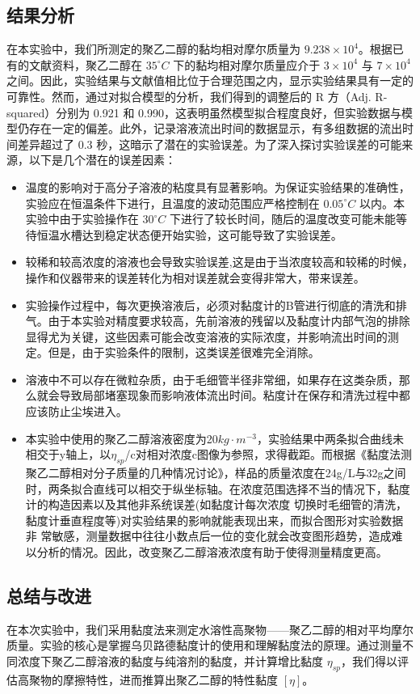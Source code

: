 \documentclass[12pt,hyperref,a4paper,UTF8]{ctexart}
\begin{document}
\subsection{结果分析}
在本实验中，我们所测定的聚乙二醇的黏均相对摩尔质量为 $9.238 \times 10^4$。根据已有的文献资料，聚乙二醇在 $35^\circ C$ 下的黏均相对摩尔质量应介于 $3 \times 10^4$ 与 $7 \times 10^4$ 之间。因此，实验结果与文献值相比位于合理范围之内，显示实验结果具有一定的可靠性。然而，通过对拟合模型的分析，我们得到的调整后的 R 方（Adj. R-squared）分别为 0.921 和 0.990，这表明虽然模型拟合程度良好，但实验数据与模型仍存在一定的偏差。此外，记录溶液流出时间的数据显示，有多组数据的流出时间差异超过了 0.3 秒，这暗示了潜在的实验误差。为了深入探讨实验误差的可能来源，以下是几个潜在的误差因素：
\begin{itemize}
    \item 温度的影响对于高分子溶液的粘度具有显著影响。\cite{1}为保证实验结果的准确性，实验应在恒温条件下进行，且温度的波动范围应严格控制在 $0.05^\circ C$ 以内。本实验中由于实验操作在 $30^\circ C$ 下进行了较长时间，随后的温度改变可能未能等待恒温水槽达到稳定状态便开始实验，这可能导致了实验误差。
    \item 较稀和较高浓度的溶液也会导致实验误差\cite{2},这是由于当浓度较高和较稀的时候，操作和仪器带来的误差转化为相对误差就会变得非常大，带来误差。
    \item 实验操作过程中，每次更换溶液后，必须对黏度计的B管进行彻底的清洗和排气。由于本实验对精度要求较高，先前溶液的残留以及黏度计内部气泡的排除显得尤为关键，这些因素可能会改变溶液的实际浓度，并影响流出时间的测定。但是，由于实验条件的限制，这类误差很难完全消除。
    \item 溶液中不可以存在微粒杂质，由于毛细管半径非常细，如果存在这类杂质，那么就会导致局部堵塞现象而影响液体流出时间\cite{3}。粘度计在保存和清洗过程中都应该防止尘埃进入。
    \item 本实验中使用的聚乙二醇溶液密度为20$kg\cdot m^{-3}$，实验结果中两条拟合曲线未相交于y轴上，以$\eta _{sp}$/c对相对浓度c图像为参照，求得截距。而根据《黏度法测聚乙二醇相对分子质量的几种情况讨论》\cite{1}，样品的质量浓度在24g/L与32g之间时，两条拟合直线可以相交于纵坐标轴。在浓度范围选择不当的情况下，黏度计的构造因素以及其他非系统误差(如黏度计每次浓度
切换时毛细管的清洗，黏度计垂直程度等)对实验结果的影响就能表现出来，而拟合图形对实验数据非
常敏感，测量数据中往往小数点后一位的变化就会改变图形趋势，造成难以分析的情况。因此，改变聚乙二醇溶液浓度有助于使得测量精度更高。
\end{itemize}

\subsection{总结与改进}
在本次实验中，我们采用黏度法来测定水溶性高聚物——聚乙二醇的相对平均摩尔质量。实验的核心是掌握乌贝路德黏度计的使用和理解黏度法的原理。通过测量不同浓度下聚乙二醇溶液的黏度与纯溶剂的黏度，并计算增比黏度 $\eta_{sp}$，我们得以评估高聚物的摩擦特性，进而推算出聚乙二醇的特性黏度 $[\eta]$。
\end{document}
